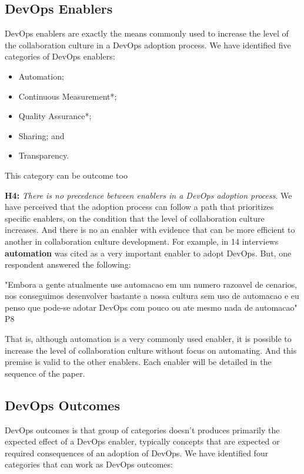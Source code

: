 \subsection{DevOps Enablers}

DevOps enablers are exactly the means commonly used to increase the level of the collaboration culture in a DevOps adoption process. We have identified five categories of DevOps enablers:

\begin{itemize}
\item Automation;
\item Continuous Measurement*;
\item Quality Assurance*;
\item Sharing; and
\item Transparency.
\end{itemize}

\footnotesize * This category can be outcome too

\normalsize
\textbf{H4:} \textit{There is no precedence between enablers in a DevOps adoption process}. We have perceived that the adoption process can follow a path that prioritizes specific enablers, on the condition that the level of collaboration culture increases. And there is no an enabler with evidence that can be more efficient to another in collaboration culture development. For example, in 14 interviews \textbf{automation} was cited as a very important enabler to adopt DevOps. But, one respondent answered the following:

"Embora a gente atualmente use automacao em um numero razoavel de cenarios, nos conseguimos desenvolver bastante a nossa cultura sem uso de automacao e eu penso que pode-se adotar DevOps com pouco ou ate mesmo nada de automacao" P8

That is, although automation is a very commonly used enabler, it is possible to increase the level of collaboration culture without focus on automating. And this premise is valid to the other enablers. Each enabler will be detailed in the sequence of the paper.

\subsection{DevOps Outcomes}
DevOps outcomes is that group of categories doesn't produces primarily the expected effect of a DevOps enabler, typically concepts that are expected or required consequences of an adoption of DevOps. We have identified four categories that can work as DevOps outcomes:

